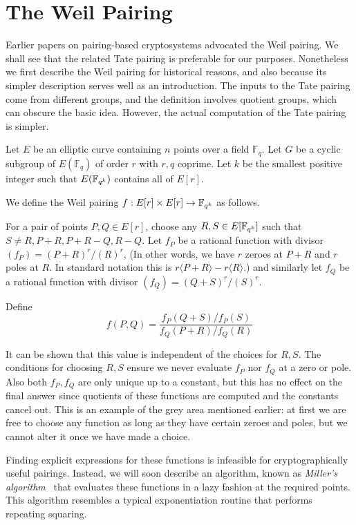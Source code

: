 \section {The Weil Pairing}

Earlier papers on pairing-based cryptosystems advocated the Weil pairing.
We shall see that the related Tate pairing is preferable for our purposes.
Nonetheless we first describe the Weil pairing
for historical reasons, and also because its simpler description
serves well as an introduction. The inputs to the Tate pairing come
from different groups, and the definition involves quotient groups,
which can obscure the basic idea. However, the actual computation
of the Tate pairing is simpler.

Let $E$ be an elliptic curve containing $n$ points over a field $\mathbb{F}_q$.
Let $G$ be a cyclic subgroup of $E(\mathbb{F}_q)$ of order $r$ with $r, q$
coprime. Let $k$ be the smallest positive integer such that $E(\mathbb{F}_{q^k})$
contains all of $E[r]$.

We define the Weil pairing
$f:E[r] \times E[r] \rightarrow \mathbb{F}_{q^k}$ as follows.

For a pair of points $P, Q \in E[r]$,
choose any $R, S \in E[\mathbb{F}_{q^k}]$ such that $S \ne R, P+R, P+R - Q, R-Q$.
Let $f_P$ be a rational function with divisor $(f_P) = (P+R)^r /(R)^r$,
(In other words, we have $r$ zeroes at $P+R$ and $r$ poles at $R$.
In standard notation this is $r\langle P+R\rangle  - r\langle R\rangle$.)
and similarly let $f_Q$ be a rational function with divisor
$(f_Q) = (Q+S)^r/(S)^r$.

Define
\[ f(P,Q) = \frac{f_P(Q+S)/f_P(S)}{f_Q(P+R)/f_Q(R)} \]

It can be shown that this value is independent
of the choices for $R, S$. The conditions for choosing $R, S$ ensure
we never evaluate $f_P$ nor $f_Q$ at a zero or pole.
Also both $f_P, f_Q$ are only unique up to a constant,
but this has no effect on the final answer since quotients
of these functions are computed and the constants cancel out.
This is an example of the grey area mentioned earlier:
at first we are free to choose
any function as long as they have certain zeroes and poles, but we cannot
alter it once we have made a choice.

Finding explicit expressions for these functions is infeasible for
cryptographically useful pairings. Instead, we will soon describe
an algorithm, known as \emph{Miller's algorithm}~\cite{miller,millerpub}
that evaluates these functions in a lazy fashion at the required
points. This algorithm resembles a typical exponentiation routine
that performs repeating squaring.

